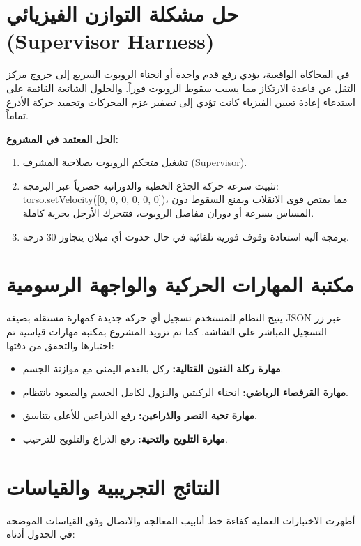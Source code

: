 \documentclass[11pt,a4paper]{article}
\begin{document}
\section{حل مشكلة التوازن الفيزيائي (Supervisor Harness)}
في المحاكاة الواقعية، يؤدي رفع قدم واحدة أو انحناء الروبوت السريع إلى خروج مركز الثقل عن قاعدة الارتكاز مما يسبب سقوط الروبوت فوراً. والحلول الشائعة القائمة على استدعاء إعادة تعيين الفيزياء كانت تؤدي إلى تصفير عزم المحركات وتجميد حركة الأذرع تماماً.

\textbf{الحل المعتمد في المشروع:}
\begin{enumerate}
    \item تشغيل متحكم الروبوت بصلاحية المشرف (\textenglish{Supervisor}).
    \item تثبيت سرعة حركة الجذع الخطية والدورانية حصرياً عبر البرمجة: \textenglish{torso.setVelocity([0, 0, 0, 0, 0, 0])}، مما يمتص قوى الانقلاب ويمنع السقوط دون المساس بسرعة أو دوران مفاصل الروبوت، فتتحرك الأرجل بحرية كاملة.
    \item برمجة آلية استعادة وقوف فورية تلقائية في حال حدوث أي ميلان يتجاوز 30 درجة.
\end{enumerate}

\section{مكتبة المهارات الحركية والواجهة الرسومية}
يتيح النظام للمستخدم تسجيل أي حركة جديدة كمهارة مستقلة بصيغة JSON عبر زر التسجيل المباشر على الشاشة. كما تم تزويد المشروع بمكتبة مهارات قياسية تم اختبارها والتحقق من دقتها:
\begin{itemize}
    \item \textbf{مهارة ركلة الفنون القتالية:} ركل بالقدم اليمنى مع موازنة الجسم.
    \item \textbf{مهارة القرفصاء الرياضي:} انحناء الركبتين والنزول لكامل الجسم والصعود بانتظام.
    \item \textbf{مهارة تحية النصر والذراعين:} رفع الذراعين للأعلى بتناسق.
    \item \textbf{مهارة التلويح والتحية:} رفع الذراع والتلويح للترحيب.
\end{itemize}

\section{النتائج التجريبية والقياسات}
أظهرت الاختبارات العملية كفاءة خط أنابيب المعالجة والاتصال وفق القياسات الموضحة في الجدول أدناه:
\end{document}
